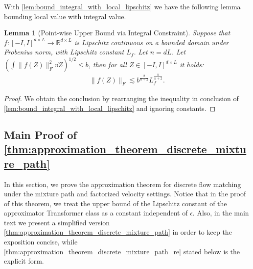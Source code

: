 \documentclass[12pt]{article}
\numberwithin{equation}{section}
\def\R{\mathbb{R}}
\theoremstyle{theoremstyle}
\newtheorem{lemma}{Lemma}[section]
\numberwithin{equation}{section}
\numberwithin{theorem}{section}
\numberwithin{proposition}{section}
\numberwithin{definition}{section}
\numberwithin{lemma}{section}
\numberwithin{assumption}{section}
\numberwithin{remark}{section}
\begin{document}
With \cref{lem:bound_integral_with_local_lipschitz} we have the following lemma bounding local value with integral value.

\begin{lemma}[Point-wise Upper Bound via Integral Constraint]\label{lem:bound_local_with_integral_lipschitz}
Suppose that $f:[-I,I]^{d\times L}\to \R^{d\times L}$ is Lipschitz continuous on a bounded domain under Frobenius norm, with Lipschitz constant $L_f$.
Let $n=dL$.
Let $(\int\|f(Z)\|_F^2\dd Z)^{1/2}\leq b$, then for all $Z\in[-I,I]^{d\times L}$ it holds:
\begin{align*}
    \|f(Z)\|_F\lesssim b^\frac{2}{n+2}L_f^\frac{n}{n+2} .
\end{align*}
\end{lemma}

\begin{proof}
We obtain the conclusion by rearranging the inequality in conclusion of \cref{lem:bound_integral_with_local_lipschitz} and ignoring constants.
\end{proof}

\subsection{Main Proof of \texorpdfstring{\cref{thm:approximation_theorem_discrete_mixture_path}}{Theorem \ref{thm:approximation_theorem_discrete_mixture_path}}}
\label{subsec:main_proof_approximation_mixture_path}

In this section, we prove the approximation theorem for discrete flow matching under the mixture path and factorized velocity settings.
Notice that in the proof of this theorem, we treat the upper bound of the Lipschitz constant of the approximator Transformer class as a constant independent of $\epsilon$.
Also, in the main text we present a simplified version \cref{thm:approximation_theorem_discrete_mixture_path} in order to keep the exposition concise, while \cref{thm:approximation_theorem_discrete_mixture_path_re} stated below is the explicit form.
\end{document}
